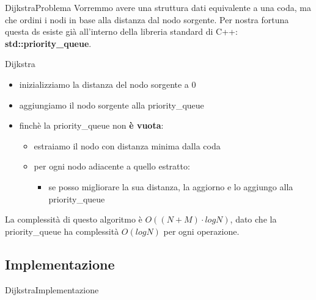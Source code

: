 \documentclass[compress]{beamer}
\begin{document}
\begin{frame}{Dijkstra}{Problema}
    Vorremmo avere una struttura dati equivalente a una coda, ma che ordini i nodi in base alla distanza dal nodo sorgente.
    Per nostra fortuna questa ds esiste già all'interno della libreria standard di C++: \textbf{std::priority\_queue}.
    \pause
    \begin{exampleblock}{Dijkstra}
        \begin{itemize}
            \item inizializziamo la distanza del nodo sorgente a 0
            \pause
            \item aggiungiamo il nodo sorgente alla priority\_queue
            \pause
            \item finch\`e la priority\_queue non \textbf{\`e vuota}:
                \begin{itemize}
                    \item estraiamo il nodo con distanza minima dalla coda
                    \pause
                    \item per ogni nodo adiacente a quello estratto:
                        \begin{itemize}
                            \item se posso migliorare la sua distanza, la aggiorno e lo aggiungo alla priority\_queue
                        \end{itemize}
                \end{itemize}
        \end{itemize}
        \pause
        La complessit\`a di questo algoritmo \`e $O((N + M) \cdot log N)$, dato che la priority\_queue ha complessit\`a $O(log N)$ per ogni operazione.
    \end{exampleblock}
\end{frame}

\subsection{Implementazione}
\begin{frame}{Dijkstra}{Implementazione}
\end{frame}
\end{document}
